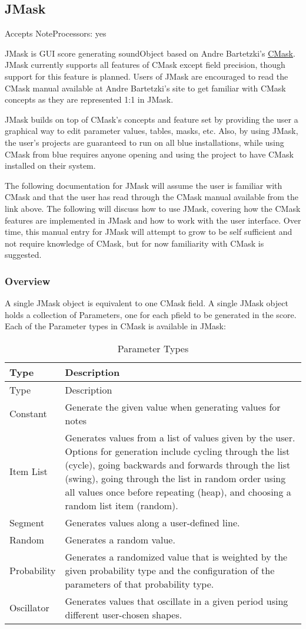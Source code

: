 \subsection{JMask}\label{jmask}

Accepts NoteProcessors: yes

JMask is GUI score generating soundObject based on Andre Bartetzki's
\href{http://www.bartetzki.de/en/software.html}{CMask}. JMask currently
supports all features of CMask except field precision, though support
for this feature is planned. Users of JMask are encouraged to read the
CMask manual available at Andre Bartetzki's site to get familiar with
CMask concepts as they are represented 1:1 in JMask.

JMask builds on top of CMask's concepts and feature set by providing the
user a graphical way to edit parameter values, tables, masks, etc. Also,
by using JMask, the user's projects are guaranteed to run on all blue
installations, while using CMask from blue requires anyone opening and
using the project to have CMask installed on their system.

The following documentation for JMask will assume the user is familiar
with CMask and that the user has read through the CMask manual available
from the link above. The following will discuss how to use JMask,
covering how the CMask features are implemented in JMask and how to work
with the user interface. Over time, this manual entry for JMask will
attempt to grow to be self sufficient and not require knowledge of
CMask, but for now familiarity with CMask is suggested.

\subsubsection{Overview}\label{jmaskOverview}

A single JMask object is equivalent to one CMask field. A single JMask
object holds a collection of Parameters, one for each pfield to be
generated in the score. Each of the Parameter types in CMask is
available in JMask:

\begin{longtable}[]{@{}ll@{}}
\caption{Parameter Types}\tabularnewline
\toprule
Type & Description\tabularnewline
\midrule
\endfirsthead
\toprule
Type & Description\tabularnewline
\midrule
\endhead
Constant & Generate the given value when generating values for
notes\tabularnewline
Item List & Generates values from a list of values given by the user.
Options for generation include cycling through the list (cycle), going
backwards and forwards through the list (swing), going through the list
in random order using all values once before repeating (heap), and
choosing a random list item (random).\tabularnewline
Segment & Generates values along a user-defined line.\tabularnewline
Random & Generates a random value.\tabularnewline
Probability & Generates a randomized value that is weighted by the given
probability type and the configuration of the parameters of that
probability type.\tabularnewline
Oscillator & Generates values that oscillate in a given period using
different user-chosen shapes.\tabularnewline
\bottomrule
\end{longtable}

